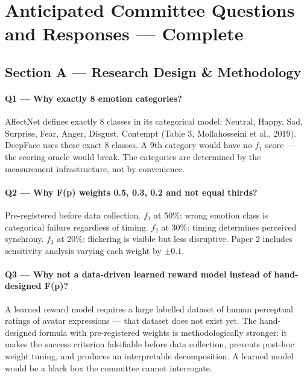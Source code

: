 \documentclass[12pt,a4paper]{article}
\begin{document}
\newpage
\section{Anticipated Committee Questions and Responses --- Complete}

\subsection*{Section A --- Research Design \& Methodology}

\paragraph{Q1 --- Why exactly 8 emotion categories?}
AffectNet defines exactly 8 classes in its categorical model: Neutral, Happy, Sad, Surprise, Fear, Anger, Disgust, Contempt (Table 3, Mollahosseini et al., 2019). DeepFace uses these exact 8 classes. A 9th category would have no $f_1$ score --- the scoring oracle would break. The categories are determined by the measurement infrastructure, not by convenience.

\paragraph{Q2 --- Why F(p) weights 0.5, 0.3, 0.2 and not equal thirds?}
Pre-registered before data collection. $f_1$ at 50\%: wrong emotion class is categorical failure regardless of timing. $f_2$ at 30\%: timing determines perceived synchrony. $f_3$ at 20\%: flickering is visible but less disruptive. Paper 2 includes sensitivity analysis varying each weight by $\pm 0.1$.

\paragraph{Q3 --- Why not a data-driven learned reward model instead of hand-designed F(p)?}
A learned reward model requires a large labelled dataset of human perceptual ratings of avatar expressions --- that dataset does not exist yet. The hand-designed formula with pre-registered weights is methodologically stronger: it makes the success criterion falsifiable before data collection, prevents post-hoc weight tuning, and produces an interpretable decomposition. A learned model would be a black box the committee cannot interrogate.
\end{document}

